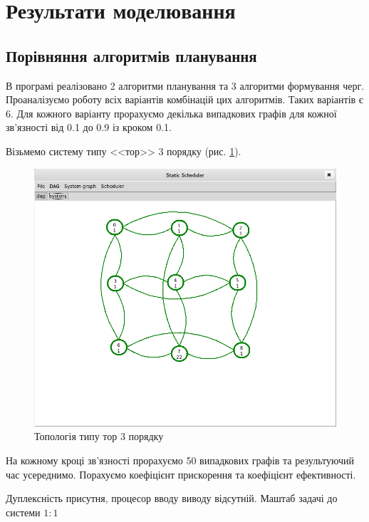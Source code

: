 \section{Результати моделювання}
    \subsection{Порівняння алгоритмів планування}

    В програмі реалізовано 2 алгоритми планування та 3 алгоритми формування черг. Проаналізуємо роботу всіх варіантів комбінацій цих алгоритмів. Таких варіантів є 6. Для кожного варіанту прорахуємо декілька випадкових графів для кожної зв'язності від 0.1 до 0.9 із кроком 0.1.

    Візьмемо систему типу <<тор>> 3 порядку (рис. \ref{fig:thor}).

    \begin{figure}[h!]
      \begin{center}
        \includegraphics[width=\textwidth]{res/thor.png}
      \end{center}
      \caption{Топологія типу тор 3 порядку}
    \label{fig:thor}
    \end{figure}

    На кожному кроці зв'язності прорахуємо 50 випадкових графів та результуючий час усереднимо.
    Порахуємо коефіцієнт прискорення та коефіцієнт ефективності.

    Дуплексність присутня, процесор вводу виводу відсутній. Маштаб задачі до системи $1:1$

